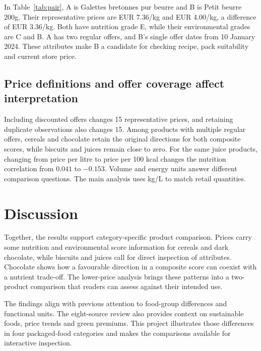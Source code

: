 \documentclass[11pt,a4paper,onecolumn,oneside]{tau-class/tau}
\begin{document}
\begin{table}[!ht]\centering\small\caption{An illustrative biscuit pair. B has a 45.7\% lower historical unit price, the same nutrition grade and a better environmental grade.}\label{tab:pair}\end{table}
In Table~\ref{tab:pair}, A is Galettes bretonnes pur beurre and B is Petit beurre 200g. Their representative prices are EUR 7.36/kg and EUR 4.00/kg, a difference of EUR 3.36/kg. Both have nutrition grade E, while their environmental grades are C and B. A has two regular offers, and B's single offer dates from 10 January 2024. These attributes make B a candidate for checking recipe, pack suitability and current store price.

\subsection{Price definitions and offer coverage affect interpretation}
Including discounted offers changes 15 representative prices, and retaining duplicate observations also changes 15. Among products with multiple regular offers, cereals and chocolate retain the original directions for both composite scores, while biscuits and juices remain close to zero. For the same juice products, changing from price per litre to price per 100 kcal changes the nutrition correlation from $0.041$ to $-0.153$. Volume and energy units answer different comparison questions. The main analysis uses kg/L to match retail quantities.

\section{Discussion}
Together, the results support category-specific product comparison. Prices carry some nutrition and environmental score information for cereals and dark chocolate, while biscuits and juices call for direct inspection of attributes. Chocolate shows how a favourable direction in a composite score can coexist with a nutrient trade-off. The lower-price analysis brings these patterns into a two-product comparison that readers can assess against their intended use.

The findings align with previous attention to food-group differences and functional units\cite{masset2015,martinez2025}. The eight-source review also provides context on sustainable foods, price trends and green premiums\cite{masset2014,hoenink2024,nakavachara2025,clark2022,desiderio2026,bai2025}. This project illustrates those differences in four packaged-food categories and makes the comparisons available for interactive inspection.
\end{document}

